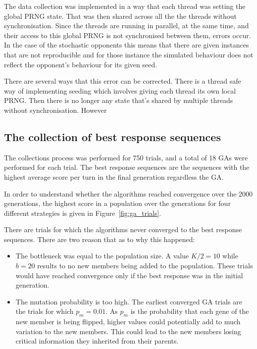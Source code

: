 The data collection was implemented in a way that each thread was setting the
global PRNG state. That was then shared across all the the threads without
synchronisation. Since the threads are running in parallel, at the same time,
and their access to this global PRNG is not synchronised between them, errors
occur. In the case of the stochastic opponents this means that there are given
instances that are not reproducible and for those instance the simulated behaviour
does not reflect the opponent's behaviour for its given seed.

There are several ways that this error can be corrected. There is a thread safe
way of implementing seeding which involves giving each thread its own local
PRNG. Then there is no longer any state that's shared by multiple threads
without synchronisation. However %


\subsection{The collection of best response sequences}

The collections process was performed for 750 trials, and a total of 18 GAs were
performed for each trial. The best response sequences are the sequences with the
highest average score per turn in the final generation regardless the GA.

In order to understand whether the algorithms reached convergence over the
2000 generations, the highest score in a population over the generations for four
different strategies is given in Figure~\ref{fig:ga_trials}.

There are trials for which the algorithms never converged to the best response
sequences. There are two reason that as to why this happened:

\begin{itemize}
    \item The bottleneck was equal to the population size. A value $K/2=10$ while
    $b=20$ results to no new members being added to the population. These trials
    would have reached convergence only if the best response was in the initial
    generation.
    \item The mutation probability is too high. The earliest converged GA trials
    are the trials for which \(p_m=0.01\). As \(p_m\) is the probability that
    each gene of the new member is being flipped, higher values could potentially
    add to much variation to the new members. This could lead to the new members
    losing critical information they inherited from their parents.
\end{itemize}

